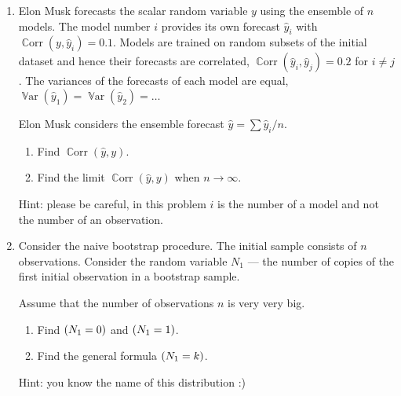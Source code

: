 \documentclass[12pt]{article}
\DeclareMathOperator{\Corr}{\mathbb{C}orr}
\DeclareMathOperator{\Var}{\mathbb{V}ar}
\let\P\relax
\DeclareMathOperator{\P}{\mathbb{P}}
\begin{document}
\begin{enumerate}
\item Elon Musk forecasts the scalar random variable $y$ using the ensemble of $n$ models.
The model number $i$ provides its own forecast $\hat y_i$ with $\Corr(y, \hat y_i) = 0.1$.
Models are trained on random subsets of the initial dataset and hence their forecasts 
are correlated, $\Corr(\hat y_i, \hat y_j) = 0.2$ for $i \neq j$. 
The variances of the forecasts of each model are equal, $\Var(\hat y_1) = \Var(\hat y_2) = \ldots$ 

Elon Musk considers the ensemble forecast $\hat y = \sum \hat y_i / n$. 

\begin{enumerate}
    \item Find $\Corr(\hat y, y)$.
    \item Find the limit $\Corr(\hat y, y)$ when $n\to \infty$.
\end{enumerate}

Hint: please be careful, in this problem $i$ is the number of a model and not the number of an observation. 

\item Consider the naive bootstrap procedure. The initial sample consists of $n$ observations.
Consider the random variable $N_1$ — the number of copies of the first initial observation in a bootstrap sample.

Assume that the number of observations $n$ is very very big. 
\begin{enumerate}
    \item Find $\P(N_1 = 0)$ and $\P(N_1 = 1)$.
    \item Find the general formula $\P(N_1 = k)$. 
\end{enumerate}

Hint: you know the name of this distribution :)

\end{enumerate}
\end{document}
